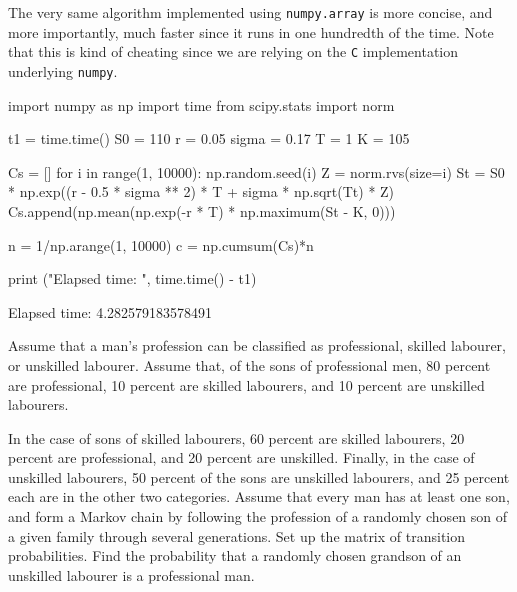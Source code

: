 \begin{solution}
The very same algorithm implemented using \texttt{numpy.array} is more concise, and more importantly, much faster since it runs in one hundredth of the time. Note that this is kind of cheating since we are relying on the \texttt{C} implementation underlying \texttt{numpy}.

\begin{ipython}
import numpy as np
import time
from scipy.stats import norm

t1 = time.time()
S0 = 110
r = 0.05
sigma = 0.17
T = 1
K = 105

Cs = []
for i in range(1, 10000):
  np.random.seed(i)
  Z = norm.rvs(size=i)
  St = S0 * np.exp((r - 0.5 * sigma ** 2) * T + sigma * np.sqrt(Tt) * Z)
  Cs.append(np.mean(np.exp(-r * T) * np.maximum(St - K, 0)))

n = 1/np.arange(1, 10000)
c = np.cumsum(Cs)*n

print ("Elapsed time: ", time.time() - t1)
\end{ipython}
\begin{ioutput}
Elapsed time:  4.282579183578491
\end{ioutput}
\end{solution}

\begin{question}
Assume that a man’s profession can be classified as professional, skilled labourer, or unskilled labourer. Assume that, of the sons of professional men, 80 percent are professional, 10 percent are skilled labourers, and 10 percent are unskilled labourers.

In the case of sons of skilled labourers, 60 percent are skilled labourers, 20 percent are professional, and 20 percent are unskilled. Finally, in the case of unskilled labourers, 50 percent of the sons are unskilled labourers, and 25 percent each are in the other two categories. Assume that every man has at least one son, and form a Markov chain by following the profession of a randomly chosen son of a given family through several generations. Set up the matrix of transition probabilities. Find the probability that a randomly chosen grandson of an unskilled labourer is a professional man.
\end{question}

